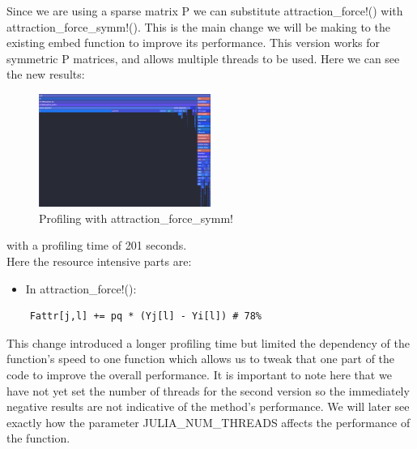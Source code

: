 Since we are using a sparse matrix P we can substitute attraction\_force!() with attraction\_force\_symm!().
This is the main change we will be making to the existing embed function to improve its performance. This
version works for symmetric P matrices, and allows multiple threads to be used. Here we can see the 
new results:
\begin{figure}[H]
    \includegraphics[width=0.5\textwidth]{media/embedProfilingSymm.png}
    \caption{Profiling with attraction\_force\_symm!}
\end{figure}
with a profiling time of 201 seconds. \\

Here the resource intensive parts are:
\begin{itemize}
    \item In attraction\_force!(): 
\end{itemize}
\begin{verbatim}
    Fattr[j,l] += pq * (Yj[l] - Yi[l]) # 78%
\end{verbatim}

This change introduced a longer profiling time but limited the dependency of the function's speed
to one function which allows us to tweak that one part of the code to improve the overall performance.
It is important to note here that we have not yet set the number of threads for the second version
so the immediately negative results are not indicative of the method's performance. We will later
see exactly how the parameter JULIA\_NUM\_THREADS affects the performance of the function.

